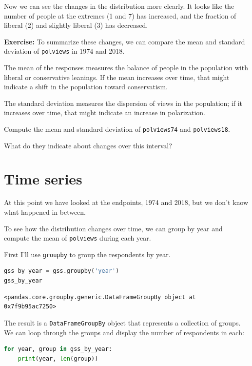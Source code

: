 Now we can see the changes in the distribution more clearly. It looks
like the number of people at the extremes (1 and 7) has increased, and
the fraction of liberal (2) and slightly liberal (3) has decreased.

\textbf{Exercise:} To summarize these changes, we can compare the mean
and standard deviation of \passthrough{\lstinline!polviews!} in 1974 and
2018.

The mean of the responses measures the balance of people in the
population with liberal or conservative leanings. If the mean increases
over time, that might indicate a shift in the population toward
conservatism.

The standard deviation measures the dispersion of views in the
population; if it increases over time, that might indicate an increase
in polarization.

Compute the mean and standard deviation of
\passthrough{\lstinline!polviews74!} and
\passthrough{\lstinline!polviews18!}.

What do they indicate about changes over this interval?

\hypertarget{time-series}{%
\section{Time series}\label{time-series}}

At this point we have looked at the endpoints, 1974 and 2018, but we
don't know what happened in between.

To see how the distribution changes over time, we can group by year and
compute the mean of \passthrough{\lstinline!polviews!} during each year.

First I'll use \passthrough{\lstinline!groupby!} to group the
respondents by year.

\begin{lstlisting}[language=Python,style=source]
gss_by_year = gss.groupby('year')
gss_by_year
\end{lstlisting}

\begin{lstlisting}[style=output]
<pandas.core.groupby.generic.DataFrameGroupBy object at 0x7f9b95ac7250>
\end{lstlisting}

The result is a \passthrough{\lstinline!DataFrameGroupBy!} object that
represents a collection of groups. We can loop through the groups and
display the number of respondents in each:

\begin{lstlisting}[language=Python,style=source]
for year, group in gss_by_year:
    print(year, len(group))
\end{lstlisting}


